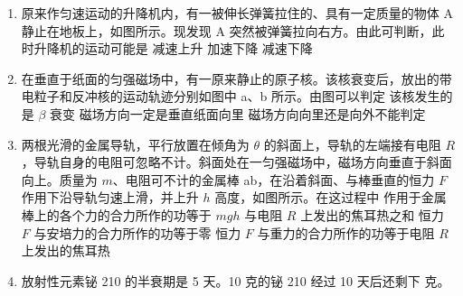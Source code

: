 \documentclass[\gkver]{gaokaozhenti}
\begin{document}
\begin{enumerate}
\item
原来作匀速运动的升降机内，有一被伸长弹簧拉住的、具有一定质量的物体 A 静止在地板上，如图所示。现发现 A 突然被弹簧拉向右方。由此可判断，此时升降机的运动可能是
\onepicture[w=3cm]{}
{减速上升}
{加速下降}
{减速下降}

\item
在垂直于纸面的匀强磁场中，有一原来静止的原子核。该核衰变后，放出的带电粒子和反冲核的运动轨迹分别如图中 a、b 所示。由图可以判定
\onepicture[w=3cm]{}
{该核发生的是 $\beta$ 衰变}
{磁场方向一定是垂直纸面向里}
{磁场方向向里还是向外不能判定}

\item
两根光滑的金属导轨，平行放置在倾角为 $\theta$ 的斜面上，导轨的左端接有电阻 $R$，导轨自身的电阻可忽略不计。斜面处在一匀强磁场中，磁场方向垂直于斜面向上。质量为 $m$、电阻可不计的金属棒 ab，在沿着斜面、与棒垂直的恒力 $F$ 作用下沿导轨匀速上滑，并上升 $h$ 高度，如图所示。在这过程中
\onepicture[w=5.5cm]{}
{作用于金属棒上的各个力的合力所作的功等于 $mgh$ 与电阻 $R$ 上发出的焦耳热之和}
{恒力 $F$ 与安培力的合力所作的功等于零}
{恒力 $F$ 与重力的合力所作的功等于电阻 $R$ 上发出的焦耳热}

\item
放射性元素铋 210 的半衰期是 5 天。10 克的铋 210 经过 10 天后还剩下  克。


\end{enumerate}
\end{document}
